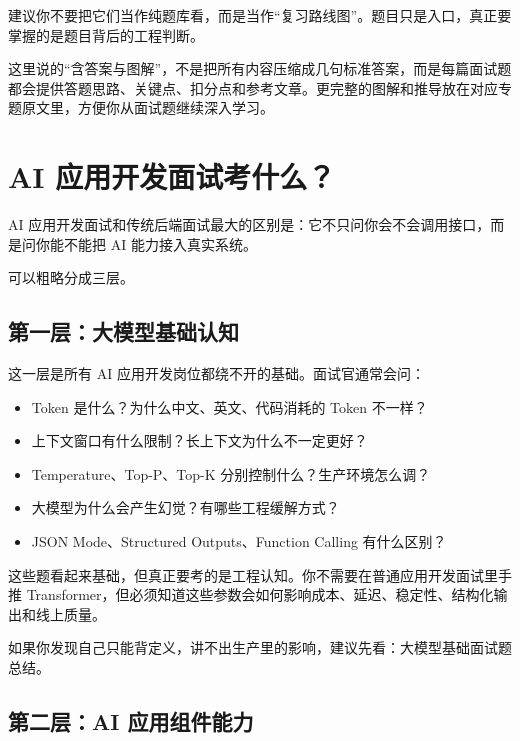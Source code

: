 \documentclass[9pt,a4paper,twocolumn]{ctexart}
\begin{document}
建议你不要把它们当作纯题库看，而是当作“复习路线图”。题目只是入口，真正要掌握的是题目背后的工程判断。



这里说的“含答案与图解”，不是把所有内容压缩成几句标准答案，而是每篇面试题都会提供答题思路、关键点、扣分点和参考文章。更完整的图解和推导放在对应专题原文里，方便你从面试题继续深入学习。



\section*{AI 应用开发面试考什么？}


AI 应用开发面试和传统后端面试最大的区别是：它不只问你会不会调用接口，而是问你能不能把 AI 能力接入真实系统。



可以粗略分成三层。



\subsection*{第一层：大模型基础认知}


这一层是所有 AI 应用开发岗位都绕不开的基础。面试官通常会问：


\begin{itemize}[itemsep=1pt, topsep=2pt]
  \item Token 是什么？为什么中文、英文、代码消耗的 Token 不一样？
  \item 上下文窗口有什么限制？长上下文为什么不一定更好？
  \item Temperature、Top-P、Top-K 分别控制什么？生产环境怎么调？
  \item 大模型为什么会产生幻觉？有哪些工程缓解方式？
  \item JSON Mode、Structured Outputs、Function Calling 有什么区别？
\end{itemize}


这些题看起来基础，但真正要考的是工程认知。你不需要在普通应用开发面试里手推 Transformer，但必须知道这些参数会如何影响成本、延迟、稳定性、结构化输出和线上质量。



如果你发现自己只能背定义，讲不出生产里的影响，建议先看：大模型基础面试题总结。



\subsection*{第二层：AI 应用组件能力}
\end{document}
